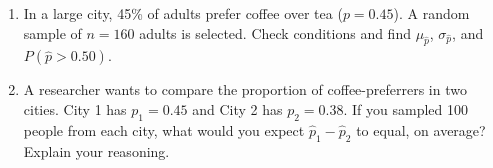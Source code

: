 \documentclass[10pt]{article}
\begin{document}
\namedateperiod

\vspace{0.15in}

\begin{enumerate}

  \item In a large city, 45\% of adults prefer coffee over tea ($p = 0.45$). A random
        sample of $n = 160$ adults is selected. Check conditions and find
        $\mu_{\hat{p}}$, $\sigma_{\hat{p}}$, and $P(\hat{p} > 0.50)$.
        \vspace{1.5in}

  \item A researcher wants to compare the proportion of coffee-preferrers in two cities.
        City 1 has $p_1 = 0.45$ and City 2 has $p_2 = 0.38$. If you sampled 100 people
        from each city, what would you expect $\hat{p}_1 - \hat{p}_2$ to equal, on
        average? Explain your reasoning.

\end{enumerate}
\end{document}
